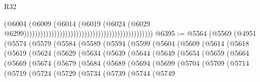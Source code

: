 \begin{lexlean}{R32}
\begin{coremodule}
                                                                                      (@6004
                                                                                        (@6009
                                                                                          (@6014
                                                                                            (@6019
                                                                                              (@6024
                                                                                                (@6029
                                                                                                  @6299)))))))))))))))))))))))))))))))))))))))))))))))
@6395 := @5564
    (@5569
      (@4951
        (@5574
          (@5579
            (@5584
              (@5589
                (@5594
                  (@5599
                    (@5604
                      (@5609
                        (@5614
                          (@5618
                            (@5619
                              (@5624
                                (@5629
                                  (@5634
                                    (@5639
                                      (@5644
                                        (@5649
                                          (@5654
                                            (@5659
                                              (@5664
                                                (@5669
                                                  (@5674
                                                    (@5679
                                                      (@5684
                                                        (@5689
                                                          (@5694
                                                            (@5699
                                                              (@5704
                                                                (@5709
                                                                  (@5714
                                                                    (@5719
                                                                      (@5724
                                                                        (@5729
                                                                          (@5734
                                                                            (@5739
                                                                              (@5744
                                                                                (@5749

\end{coremodule}
\end{lexlean}
